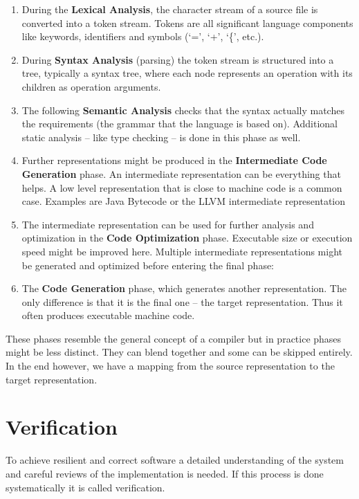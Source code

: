 \begin{enumerate}
  \item During the \textbf{Lexical Analysis}, the character stream of a source file is converted into a token stream.
  Tokens are all significant language components like keywords, identifiers and symbols (`=', `+', `\{', etc.).
  \item During \textbf{Syntax Analysis} (parsing) the token stream is structured into a tree,
  typically a syntax tree, where each node represents an operation with its children as operation arguments.
  \item The following \textbf{Semantic Analysis} checks that the syntax actually matches the requirements (the grammar that the language is based on).\newline
  Additional static analysis -- like type checking -- is done in this phase as well.
  \item Further representations might be produced in the \textbf{Intermediate Code Generation} phase.
  An intermediate representation can be everything that helps.
  A low level representation that is close to machine code is a common case.
  Examples are Java Bytecode or the LLVM intermediate representation
  \item The intermediate representation can be used for further analysis and optimization in the \textbf{Code Optimization} phase.
  Executable size or execution speed might be improved here.
  Multiple intermediate representations might be generated and optimized before entering the final phase:
  \item The \textbf{Code Generation} phase, which generates another representation.
  The only difference is that it is the final one -- the target representation.
  Thus it often produces executable machine code.
\end{enumerate}

These phases resemble the general concept of a compiler but in practice phases might be less distinct.
They can blend together and some can be skipped entirely.
In the end however, we have a mapping from the source representation to the target representation.

\section{Verification}
\label{rel_mc}
To achieve resilient and correct software a detailed understanding of the system and careful reviews of the implementation is needed.
If this process is done systematically it is called verification.

